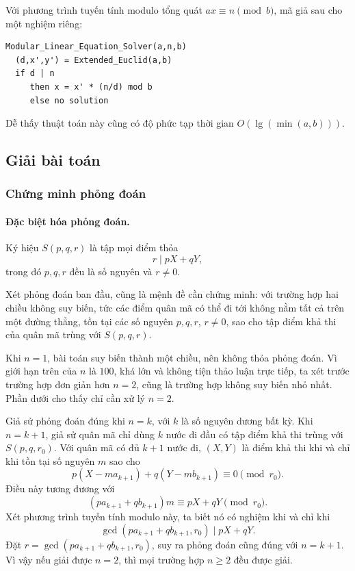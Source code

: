 \documentclass[11pt]{article}
\begin{document}
Với phương trình tuyến tính modulo tổng quát \(ax\equiv n\pmod b\), mã giả sau
cho một nghiệm riêng:
\begin{verbatim}
Modular_Linear_Equation_Solver(a,n,b)
  (d,x',y') = Extended_Euclid(a,b)
  if d | n
     then x = x' * (n/d) mod b
     else no solution
\end{verbatim}

Dễ thấy thuật toán này cũng có độ phức tạp thời gian
\(O(\lg(\min(a,b)))\).

\subsection{Giải bài toán}

\subsubsection{Chứng minh phỏng đoán}

\paragraph{Đặc biệt hóa phỏng đoán.}
Ký hiệu \(S(p,q,r)\) là tập mọi điểm thỏa
\[
  r\mid pX+qY,
\]
trong đó \(p,q,r\) đều là số nguyên và \(r\ne 0\).

Xét phỏng đoán ban đầu, cũng là mệnh đề cần chứng minh: với trường hợp hai
chiều không suy biến, tức các điểm quân mã có thể đi tới không nằm tất cả trên
một đường thẳng, tồn tại các số nguyên \(p,q,r\), \(r\ne 0\), sao cho tập điểm
khả thi của quân mã trùng với \(S(p,q,r)\).

Khi \(n=1\), bài toán suy biến thành một chiều, nên không thỏa phỏng đoán. Vì
giới hạn trên của \(n\) là \(100\), khá lớn và không tiện thảo luận trực tiếp,
ta xét trước trường hợp đơn giản hơn \(n=2\), cũng là trường hợp không suy
biến nhỏ nhất. Phần dưới cho thấy chỉ cần xử lý \(n=2\).

Giả sử phỏng đoán đúng khi \(n=k\), với \(k\) là số nguyên dương bất kỳ. Khi
\(n=k+1\), giả sử quân mã chỉ dùng \(k\) nước đi đầu có tập điểm khả thi trùng
với \(S(p,q,r_0)\). Với quân mã có đủ \(k+1\) nước đi, \((X,Y)\) là điểm khả
thi khi và chỉ khi tồn tại số nguyên \(m\) sao cho
\[
  p(X-ma_{k+1})+q(Y-mb_{k+1})\equiv 0\pmod{r_0}.
\]
Điều này tương đương với
\[
  (pa_{k+1}+qb_{k+1})m\equiv pX+qY\pmod{r_0}.
\]
Xét phương trình tuyến tính modulo này, ta biết nó có nghiệm khi và chỉ khi
\[
  \gcd(pa_{k+1}+qb_{k+1},r_0)\mid pX+qY.
\]
Đặt \(r=\gcd(pa_{k+1}+qb_{k+1},r_0)\), suy ra phỏng đoán cũng đúng với
\(n=k+1\). Vì vậy nếu giải được \(n=2\), thì mọi trường hợp \(n\ge 2\) đều
được giải.
\end{document}
